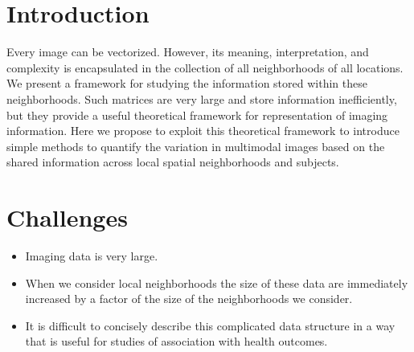 \documentclass[a0,landscape]{a0poster}
\begin{document}
\vspace{1cm} %


\begin{multicols}{3} %


\color{black} %


\color{black} %
\large{\section*{\color{uwred}Introduction}}
\noindent Every image can be vectorized. However, its meaning, interpretation, and complexity is encapsulated in the collection of all neighborhoods of all locations. We present a framework for studying the information stored within these neighborhoods. Such  matrices are very large and store information inefficiently, but they provide a useful theoretical framework for representation of imaging information. Here we propose to exploit this theoretical framework to introduce simple methods to quantify the variation in multimodal images based on the shared information across local spatial neighborhoods and subjects.
{\section*{\color{uwred}Challenges}}
\begin{itemize}
\item  Imaging data is very large.
\item When we consider local neighborhoods the size of these data are immediately increased by a factor of the size of the neighborhoods we consider.
\item It is difficult to concisely describe this complicated data structure in a way that is useful for studies of association with health outcomes.
\end{itemize}
 	


\end{multicols}
\end{document}
